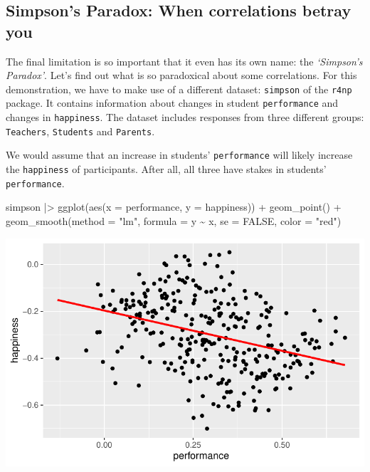 \documentclass[
  letterpaper,
]{krantz}
\makeatletter
\newenvironment{Shaded}{\begin{snugshade}}{\end{snugshade}}
\newcommand{\AttributeTok}[1]{\textcolor[rgb]{0.40,0.45,0.13}{#1}}
\newcommand{\ConstantTok}[1]{\textcolor[rgb]{0.56,0.35,0.01}{#1}}
\newcommand{\FunctionTok}[1]{\textcolor[rgb]{0.28,0.35,0.67}{#1}}
\newcommand{\NormalTok}[1]{\textcolor[rgb]{0.00,0.23,0.31}{#1}}
\newcommand{\SpecialCharTok}[1]{\textcolor[rgb]{0.37,0.37,0.37}{#1}}
\newcommand{\StringTok}[1]{\textcolor[rgb]{0.13,0.47,0.30}{#1}}
\newenvironment{kframe}{%
\medskip{}
\setlength{\fboxsep}{.8em}
 \def\at@end@of@kframe{}%
 \ifinner\ifhmode%
  \def\at@end@of@kframe{\end{minipage}}%
  \begin{minipage}{\columnwidth}%
 \fi\fi%
 \def\FrameCommand##1{\hskip\@totalleftmargin \hskip-\fboxsep
 \colorbox{shadecolor}{##1}\hskip-\fboxsep
     \hskip-\linewidth \hskip-\@totalleftmargin \hskip\columnwidth}%
 \MakeFramed {\advance\hsize-\width
   \@totalleftmargin\z@ \linewidth\hsize
   \@setminipage}}%
 {\par\unskip\endMakeFramed%
 \at@end@of@kframe}
\renewenvironment{Shaded}{\begin{kframe}}{\end{kframe}}
\makeatother
\begin{document}
\subsection{Simpson's Paradox: When correlations betray
you}\label{sec-simpsons-paradox}

The final limitation is so important that it even has its own name: the
\emph{`Simpson's Paradox'}. Let's find out what is so paradoxical about
some correlations. For this demonstration, we have to make use of a
different dataset: \texttt{simpson} of the \texttt{r4np} package. It
contains information about changes in student \texttt{performance} and
changes in \texttt{happiness}. The dataset includes responses from three
different groups: \texttt{Teachers}, \texttt{Students} and
\texttt{Parents}.

We would assume that an increase in students' \texttt{performance} will
likely increase the \texttt{happiness} of participants. After all, all
three have stakes in students' \texttt{performance}.

\begin{Shaded}
\begin{Highlighting}[]
\NormalTok{simpson }\SpecialCharTok{|\textgreater{}}
  \FunctionTok{ggplot}\NormalTok{(}\FunctionTok{aes}\NormalTok{(}\AttributeTok{x =}\NormalTok{ performance,}
             \AttributeTok{y =}\NormalTok{ happiness)) }\SpecialCharTok{+}
  \FunctionTok{geom\_point}\NormalTok{() }\SpecialCharTok{+}
  \FunctionTok{geom\_smooth}\NormalTok{(}\AttributeTok{method =} \StringTok{"lm"}\NormalTok{,}
              \AttributeTok{formula =}\NormalTok{ y }\SpecialCharTok{\textasciitilde{}}\NormalTok{ x,}
              \AttributeTok{se =} \ConstantTok{FALSE}\NormalTok{,}
              \AttributeTok{color =} \StringTok{"red"}\NormalTok{)}
\end{Highlighting}
\end{Shaded}

\includegraphics{10_correlations_files/figure-pdf/simpson-paradox-plot-1.pdf}
\end{document}
